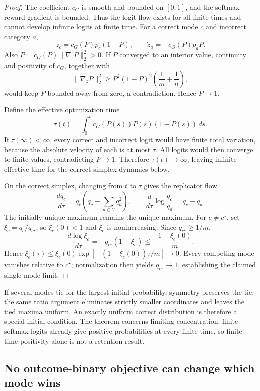 \documentclass{article}
\newcommand{\1}{\mathbf 1}
\theoremstyle{remark}
\theoremstyle{definition}
\theoremstyle{plain}
\begin{document}
\begin{proof}
The coefficient $c_G$ is smooth and bounded on $[0,1]$, and the softmax
reward gradient is bounded. Thus the logit flow exists for all finite times
and cannot develop infinite logits at finite time.
For a correct mode $c$ and incorrect category $a$,
\[
  \dot z_c=c_G(P)p_c(1-P),
  \qquad
  \dot z_a=-c_G(P)p_aP.
\]
Also $\dot P=c_G(P)\lVert\nabla_zP\rVert_2^2>0$. If $P$ converged to an
interior value, continuity and positivity of $c_G$, together with
\[
 \lVert\nabla_zP\rVert_2^2
 \ge P^2(1-P)^2\left(\frac1m+\frac1n\right),
\]
would keep $\dot P$ bounded away from zero, a contradiction. Hence $P\to1$.

Define the effective optimization time
\[
  \tau(t)=\int_0^t c_G(P(s))P(s)(1-P(s))\,ds.
\]
If $\tau(\infty)<\infty$, every correct and incorrect logit would have finite
total variation, because the absolute velocity of each is at most $\dot\tau$.
All logits would then converge to finite values, contradicting $P\to1$.
Therefore $\tau(t)\to\infty$, leaving infinite effective time for the
correct-simplex dynamics below.

On the correct simplex, changing from $t$ to $\tau$ gives the replicator flow
\begin{equation}
  \frac{dq_c}{d\tau}
  =q_c\left(q_c-\sum_{d\in\mathcal C}q_d^2\right),
  \qquad
  \frac{d}{d\tau}\log\frac{q_c}{q_d}=q_c-q_d.
  \label{eq:grpo-replicator}
\end{equation}
The initially unique maximum remains the unique maximum. For $c\ne c^\star$,
set $\xi_c=q_c/q_{c^\star}$, so $\xi_c(0)<1$ and $\xi_c$ is nonincreasing.
Since $q_{c^\star}\ge1/m$,
\[
 \frac{d\log\xi_c}{d\tau}
 =-q_{c^\star}(1-\xi_c)
 \le-\frac{1-\xi_c(0)}{m}.
\]
Hence $\xi_c(\tau)\le\xi_c(0)\exp[-(1-\xi_c(0))\tau/m]\to0$.
Every competing mode vanishes relative to $c^\star$; normalization then
yields $q_{c^\star}\to1$, establishing the claimed single-mode limit.
\end{proof}

If several modes tie for the largest initial probability, symmetry preserves
the tie; the same ratio argument eliminates strictly smaller coordinates and
leaves the tied maxima uniform. An exactly uniform correct distribution is
therefore a special initial condition. The theorem concerns limiting
concentration: finite softmax logits already give positive probabilities at
every finite time, so finite-time positivity alone is not a retention result.

\subsection{No outcome-binary objective can change which mode wins}
\label{app:theory-objective-inertness}
\end{document}
